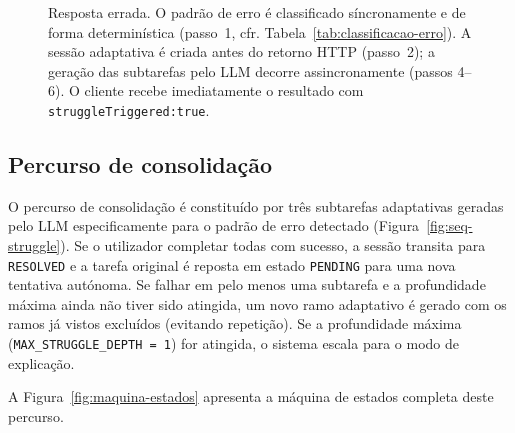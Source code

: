 \begin{figure}[H]
	\caption[Sequ\^encia: resposta errada e activa\c{c}\~ao do percurso adaptativo]{Resposta errada. O padr\~ao de erro \'e classificado s\'incronamente e de forma determin\'istica (passo~1, cfr. Tabela~\ref{tab:classificacao-erro}). A sess\~ao adaptativa \'e criada antes do retorno HTTP (passo~2); a gera\c{c}\~ao das subtarefas pelo LLM decorre assincronamente (passos 4--6). O cliente recebe imediatamente o resultado com \texttt{struggleTriggered:true}.}
	\label{fig:seq-wrong}
\end{figure}

\subsection{Percurso de consolida\c{c}\~ao}
\label{ssec:seq-struggle}

O percurso de consolida\c{c}\~ao \'e constitu\'ido por tr\^es subtarefas
adaptativas geradas pelo LLM especificamente para o padr\~ao de erro detectado
(Figura~\ref{fig:seq-struggle}). Se o utilizador completar todas com sucesso,
a sess\~ao transita para \texttt{RESOLVED} e a tarefa original \'e reposta em
estado \texttt{PENDING} para uma nova tentativa aut\'onoma. Se falhar em pelo
menos uma subtarefa e a profundidade m\'axima ainda n\~ao tiver sido atingida,
um novo ramo adaptativo \'e gerado com os ramos j\'a vistos exclu\'idos
(evitando repeti\c{c}\~ao). Se a profundidade m\'axima (\texttt{MAX\_STRUGGLE\_DEPTH = 1})
for atingida, o sistema escala para o modo de explica\c{c}\~ao.

\vspace*{\fill}
\newpage
A Figura~\ref{fig:maquina-estados} apresenta a m\'aquina de estados completa
deste percurso.

